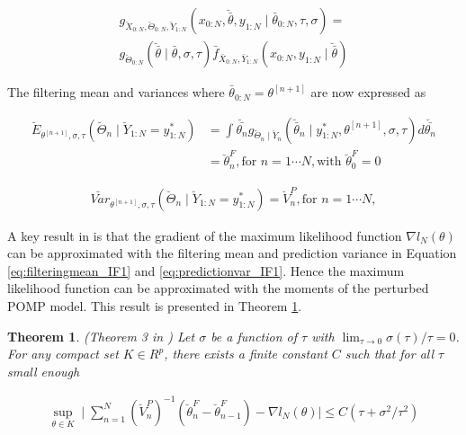\documentclass[twoside,openright]{report}
\newtheorem{theorem}{Theorem}[section]
\begin{document}
\begin{align}
    g_{\breve{X}_{0:N}, \breve{\Theta}_{0:N}, \breve{Y}_{1:N}}(x_{0:N}, \breve{\bar{\theta}}, y_{1:N} \mid \bar{\theta}_{0:N}, \tau, \sigma) = \\
    g_{\breve{\Theta}_{0:N}}(\breve{\bar{\theta}} \mid \bar{\theta}, \sigma, \tau) 
    \bar{f}_{\bar{X}_{0:N}, \bar{Y}_{1:N}}(x_{0:N}, y_{1:N} \mid \breve{\bar{\theta}})
\end{align}

The filtering mean and variances where $\bar{\theta}_{0:N}  = \theta^{[ n +1 ]}$ are now expressed as

\begin{align}
    \breve{E}_{\theta^{[ n + 1 ]}, \sigma, \tau}( \breve{\Theta}_n \mid \breve{Y}_{1:N} = y_{1:N}^{*} ) &= \int \breve{\bar{\theta_n}}  g_{ \breve{\Theta}_{n} \mid \breve{Y}_{n}} (\breve{\bar{\theta}}_{n} \mid  y_{1:N}^{*} , \theta^{[ n + 1 ]}, \sigma, \tau) d\breve{\bar{\theta_n}} \label{eq:filteringmean_IF1} \\ 
    &= \breve{ \theta}_{n}^{F}, \text{for} \,\, n = 1 \cdots N, \text{with} \,\, \breve{ \theta}_{0}^{F} = 0  \nonumber 
\end{align}

\begin{align}
    \breve{Var}_{\theta^{[ n + 1 ]}, \sigma, \tau}( \breve{\Theta}_n \mid \breve{Y}_{1:N} = y_{1:N}^{*} ) = \breve{V}_{n}^{P}, \text{for} \,\, n = 1 \cdots N,  \label{eq:predictionvar_IF1}
\end{align}

A key result in \cite{ionides2011iterated} is that the gradient of the maximum likelihood function $\nabla l_{N}(\theta)$ can be approximated with the filtering mean and prediction variance in Equation \ref{eq:filteringmean_IF1} and \ref{eq:predictionvar_IF1}. Hence the maximum likelihood function can be approximated with the  moments of the perturbed POMP model. This result is presented in Theorem \ref{th:ionides_th3}.  

\begin{theorem} \label{th:ionides_th3}
(Theorem 3 in \cite{ionides2011iterated}) Let $\sigma$ be a function of $\tau$ with $\lim_{ \tau \to 0} \sigma(\tau)/ \tau = 0 $. For any compact set $K \in R^{p}$, there exists a finite constant $C$ such that for all $\tau$ small enough

\begin{align}
    \sup_{\theta \in K} \mid  \sum_{n=1}^{N} ( \breve{V}_{n}^{P} )^{-1} (\breve{\theta}_{n}^{F}  - \breve{\theta}_{n-1}^{F}) - \nabla l_{N}(\theta)  \mid \leq C (\tau + \sigma^2 / \tau^2 )   
\end{align}
\end{theorem}
\end{document}

